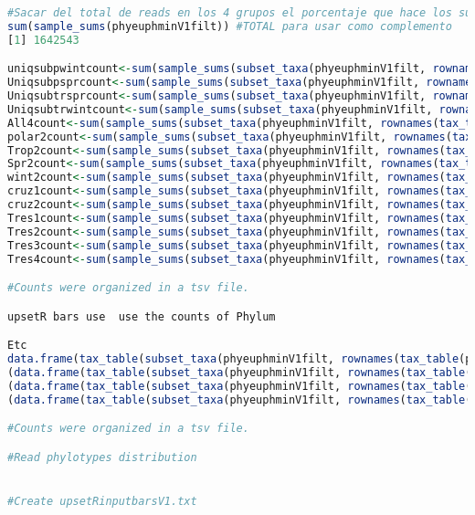 \documentclass{article}
\begin{document}
\begin{lstlisting}[language=R,caption={N1N2figscripts}]
#Sacar del total de reads en los 4 grupos el porcentaje que hace los subgroups)
sum(sample_sums(phyeuphminV1filt)) #TOTAL para usar como complemento
[1] 1642543

uniqsubpwintcount<-sum(sample_sums(subset_taxa(phyeuphminV1filt, rownames(tax_table(physeq)) %in% uniqsubpwint)))
Uniqsubpsprcount<-sum(sample_sums(subset_taxa(phyeuphminV1filt, rownames(tax_table(physeq)) %in% Uniqsubpspr)))
Uniqsubtrsprcount<-sum(sample_sums(subset_taxa(phyeuphminV1filt, rownames(tax_table(physeq)) %in% Uniqsubtrspr)))
Uniqsubtrwintcount<-sum(sample_sums(subset_taxa(phyeuphminV1filt, rownames(tax_table(physeq)) %in% Uniqsubtrwint)))
All4count<-sum(sample_sums(subset_taxa(phyeuphminV1filt, rownames(tax_table(physeq)) %in% All4)))
polar2count<-sum(sample_sums(subset_taxa(phyeuphminV1filt, rownames(tax_table(physeq)) %in% polar2)))
Trop2count<-sum(sample_sums(subset_taxa(phyeuphminV1filt, rownames(tax_table(physeq)) %in% Trop2)))
Spr2count<-sum(sample_sums(subset_taxa(phyeuphminV1filt, rownames(tax_table(physeq)) %in% Spr2)))
wint2count<-sum(sample_sums(subset_taxa(phyeuphminV1filt, rownames(tax_table(physeq)) %in% wint2)))
cruz1count<-sum(sample_sums(subset_taxa(phyeuphminV1filt, rownames(tax_table(physeq)) %in% cruz1)))
cruz2count<-sum(sample_sums(subset_taxa(phyeuphminV1filt, rownames(tax_table(physeq)) %in% cruz2)))
Tres1count<-sum(sample_sums(subset_taxa(phyeuphminV1filt, rownames(tax_table(physeq)) %in% Tres1)))
Tres2count<-sum(sample_sums(subset_taxa(phyeuphminV1filt, rownames(tax_table(physeq)) %in% Tres2)))
Tres3count<-sum(sample_sums(subset_taxa(phyeuphminV1filt, rownames(tax_table(physeq)) %in% Tres3)))
Tres4count<-sum(sample_sums(subset_taxa(phyeuphminV1filt, rownames(tax_table(physeq)) %in% Tres4)))

#Counts were organized in a tsv file.

upsetR bars use  use the counts of Phylum 

Etc
data.frame(tax_table(subset_taxa(phyeuphminV1filt, rownames(tax_table(physeq)) %in% Tres1))))[,1:3])
(data.frame(tax_table(subset_taxa(phyeuphminV1filt, rownames(tax_table(physeq)) %in% Tres2))))
(data.frame(tax_table(subset_taxa(phyeuphminV1filt, rownames(tax_table(physeq)) %in% Tres3))))
(data.frame(tax_table(subset_taxa(phyeuphminV1filt, rownames(tax_table(physeq)) %in% Tres4))))

#Counts were organized in a tsv file.

#Read phylotypes distribution


#Create upsetRinputbarsV1.txt


\end{lstlisting}
\end{document}
